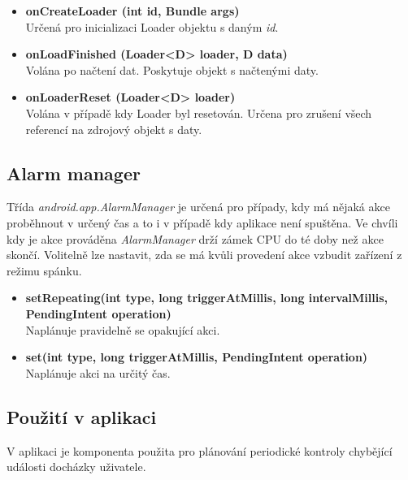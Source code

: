 \documentclass{diplomka}
\begin{document}
\begin{itemize}[]
\item \textbf{onCreateLoader (int id, Bundle args)}\\
Určená pro inicializaci Loader objektu s daným \emph{id}.
\item \textbf{onLoadFinished (Loader<D> loader, D data)}\\
Volána po načtení dat. Poskytuje objekt s načtenými daty.
\item \textbf{onLoaderReset (Loader<D> loader)}\\
Volána v případě kdy Loader byl resetován. Určena pro zrušení všech referencí na zdrojový objekt s daty.
\end{itemize}


\subsection{Alarm manager}
Třída \emph{android.app.AlarmManager} je určená pro případy, kdy má nějaká akce proběhnout v určený čas a to i v případě kdy aplikace není spuštěna. Ve chvíli kdy je akce prováděna \emph{AlarmManager} drží zámek CPU do té doby než akce skončí. Volitelně lze nastavit, zda se má kvůli provedení akce vzbudit zařízení z režimu spánku.
\begin{itemize}[]
\item \textbf{setRepeating(int type, long triggerAtMillis, long intervalMillis, PendingIntent operation)}\\
Naplánuje pravidelně se opakující akci.
\item \textbf{set(int type, long triggerAtMillis, PendingIntent operation)}\\
Naplánuje akci na určitý čas.
\end{itemize}
\subsection*{Použití v aplikaci}
V aplikaci je komponenta použita pro plánování periodické kontroly chybějící události docházky uživatele.
\end{document}
